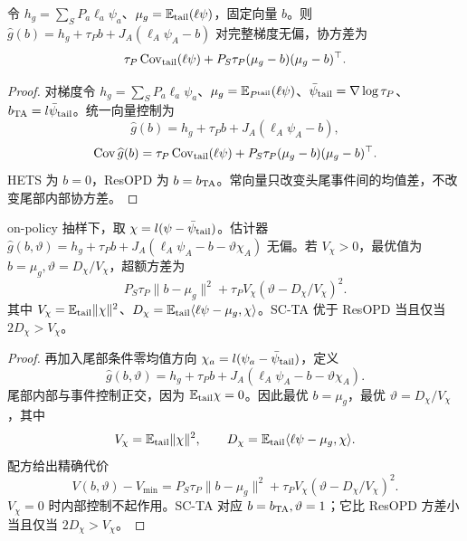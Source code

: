 \begin{proposition}[向量尾部控制族的协方差]
令 $h_g=\sum_SP_a\ell_a\psi_a$、$\mu_g=\mathbb E_{\rm tail}(\ell\psi)$，固定向量 $b$。则 $\widehat g(b)=h_g+\tau_Pb+J_A(\ell_A\psi_A-b)$ 对完整梯度无偏，协方差为
\begin{equation}
\tau_P\operatorname{Cov}_{\rm tail}(\ell\psi)+P_S\tau_P(\mu_g-b)(\mu_g-b)^\top.
\end{equation}
\end{proposition}
\begin{proof}
对梯度令 $h_g=\sum_SP_a\ell_a\psi_a$、$\mu_g=\mathbb E_{P^{\rm tail}}(\ell\psi)$、$\bar\psi_{\rm tail}=\nabla\log\tau_P$、$b_{\rm TA}=l\bar\psi_{\rm tail}$。统一向量控制为
\begin{equation}
\widehat g(b)=h_g+\tau_Pb+J_A(\ell_A\psi_A-b),
\end{equation}
\begin{equation}
\operatorname{Cov}\widehat g(b)=\tau_P\operatorname{Cov}_{\rm tail}(\ell\psi)
+P_S\tau_P(\mu_g-b)(\mu_g-b)^\top.
\end{equation}
HETS 为 $b=0$，ResOPD 为 $b=b_{\rm TA}$。常向量只改变头尾事件间的均值差，不改变尾部内部协方差。
\end{proof}

\begin{proposition}[正交双控制的最优值与排序]
on-policy 抽样下，取 $\chi=l(\psi-\bar\psi_{\rm tail})$。估计器 $\widehat g(b,\vartheta)=h_g+\tau_Pb+J_A(\ell_A\psi_A-b-\vartheta\chi_A)$ 无偏。若 $V_\chi>0$，最优值为 $b=\mu_g,\vartheta=D_\chi/V_\chi$，超额方差为
\begin{equation}
P_S\tau_P\|b-\mu_g\|^2+\tau_PV_\chi(\vartheta-D_\chi/V_\chi)^2.
\end{equation}
其中 $V_\chi=\mathbb E_{\rm tail}\|\chi\|^2$、$D_\chi=\mathbb E_{\rm tail}\langle\ell\psi-\mu_g,\chi\rangle$。SC-TA 优于 ResOPD 当且仅当 $2D_\chi>V_\chi$。
\end{proposition}
\begin{proof}
再加入尾部条件零均值方向 $\chi_a=l(\psi_a-\bar\psi_{\rm tail})$，定义
\begin{equation}
\widehat g(b,\vartheta)=h_g+\tau_Pb+J_A(\ell_A\psi_A-b-\vartheta\chi_A).
\end{equation}
尾部内部与事件控制正交，因为 $\mathbb E_{\rm tail}\chi=0$。因此最优 $b=\mu_g$，最优 $\vartheta=D_\chi/V_\chi$，其中
\begin{equation}
V_\chi=\mathbb E_{\rm tail}\|\chi\|^2,\qquad
D_\chi=\mathbb E_{\rm tail}\langle\ell\psi-\mu_g,\chi\rangle.
\end{equation}
配方给出精确代价
\begin{equation}
V(b,\vartheta)-V_{\min}
=P_S\tau_P\|b-\mu_g\|^2
+\tau_PV_\chi(\vartheta-D_\chi/V_\chi)^2.
\end{equation}
$V_\chi=0$ 时内部控制不起作用。SC-TA 对应 $b=b_{\rm TA},\vartheta=1$；它比 ResOPD 方差小当且仅当 $2D_\chi>V_\chi$。
\end{proof}

